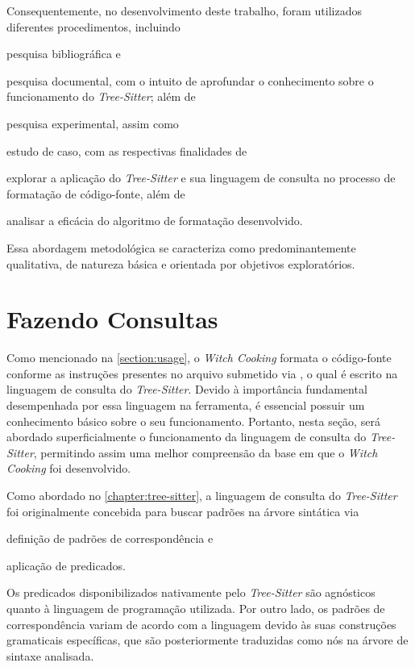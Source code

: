 \documentclass
  [11pt,a4paper,english,brazil,openright,sumario=tradicional,twoside]
  {abntex2}
\newcommand{\treesitter}{\textit{Tree-Sitter}\xspace}
\newcommand{\witchcooking}{\textit{Witch Cooking}\xspace}
\begin{document}
  Consequentemente, no desenvolvimento deste trabalho, foram utilizados
  diferentes procedimentos, incluindo
  \begin{inparaenum}
    \item pesquisa bibliográfica e
    \item pesquisa documental, com o intuito de aprofundar o conhecimento sobre
          o funcionamento do \treesitter; além de
    \item pesquisa experimental, assim como
    \item estudo de caso, com as respectivas finalidades de
          \begin{inparaenum}
            \item explorar a aplicação do \treesitter e sua linguagem de
                  consulta no processo de formatação de código-fonte, além de
            \item analisar a eficácia do algoritmo de formatação desenvolvido.
          \end{inparaenum}
  \end{inparaenum}
  Essa abordagem metodológica se caracteriza como predominantemente
  qualitativa, de natureza básica e orientada por objetivos exploratórios.


  \section{Fazendo Consultas}

  Como mencionado na \cref{section:usage}, o \witchcooking formata o
  código-fonte conforme as instruções presentes no arquivo submetido via
  , o qual é escrito na linguagem de consulta do
  \treesitter. Devido à importância fundamental desempenhada por essa linguagem
  na ferramenta, é essencial possuir um conhecimento básico sobre o seu
  funcionamento. Portanto, nesta seção, será abordado superficialmente o
  funcionamento da linguagem de consulta do \treesitter, permitindo assim uma
  melhor compreensão da base em que o \witchcooking foi desenvolvido.

  Como abordado no \cref{chapter:tree-sitter}, a linguagem de consulta do
  \treesitter foi originalmente concebida para buscar padrões na árvore
  sintática via
  \begin{inparaenum}
    \item definição de padrões de correspondência e
    \item aplicação de predicados.
  \end{inparaenum}
  Os predicados disponibilizados nativamente pelo \treesitter são agnósticos
  quanto à linguagem de programação utilizada. Por outro lado, os padrões de
  correspondência variam de acordo com a linguagem devido às suas construções
  gramaticais específicas, que são posteriormente traduzidas como nós na árvore
  de sintaxe analisada.
\end{document}
